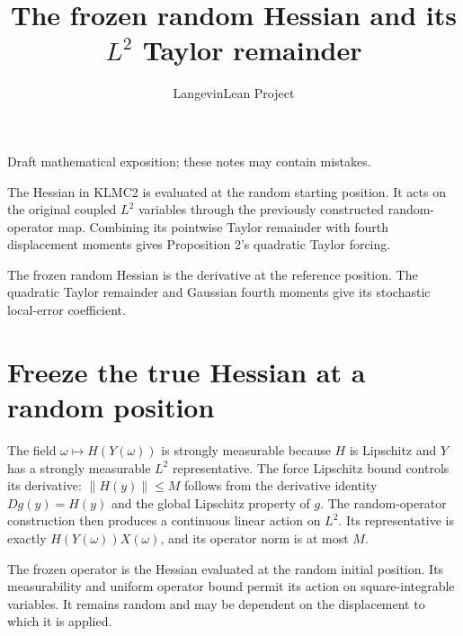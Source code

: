 \documentclass[11pt,a4paper]{article}
\title{\texorpdfstring{The frozen random Hessian and its \(L^{2}\) Taylor remainder}{The frozen random Hessian and its L² Taylor remainder}}
\author{LangevinLean Project}
\date{}
\begin{document}
\maketitle
Draft mathematical exposition; these notes may contain mistakes.


The Hessian in KLMC2 is evaluated at the random starting position. It acts on the original coupled \(L^{2}\) variables through the previously constructed random-operator map. Combining its pointwise Taylor remainder with fourth displacement moments gives Proposition 2’s quadratic Taylor forcing.



The frozen random Hessian is the derivative at the reference position. The quadratic Taylor remainder and Gaussian fourth moments give its stochastic local-error coefficient.


\section{\texorpdfstring{Freeze the true Hessian at a random position}{Freeze the true Hessian at a random position}}


The field \(\omega \mapsto H(Y(\omega ))\) is strongly measurable because \(H\) is Lipschitz and \(Y\) has a strongly measurable \(L^{2}\) representative. The force Lipschitz bound controls its derivative: \(\|H(y)\|\le M\) follows from the derivative identity \(Dg(y)=H(y)\) and the global Lipschitz property of \(g\). The random-operator construction then produces a continuous linear action on \(L^{2}\). Its representative is exactly \(H(Y(\omega ))X(\omega )\), and its operator norm is at most \(M\).



The frozen operator is the Hessian evaluated at the random initial position. Its measurability and uniform operator bound permit its action on square-integrable variables. It remains random and may be dependent on the displacement to which it is applied.
\end{document}
